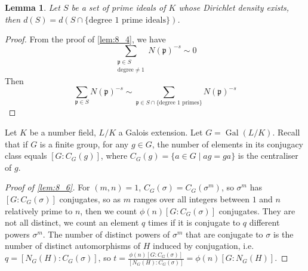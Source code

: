 \documentclass[11pt]{article}
\theoremstyle{definition}
\theoremstyle{plain}
\newtheorem{lemma}[definition]{Lemma}
\theoremstyle{remark}
\DeclareMathOperator{\Gal}{Gal}
\newcommand{\fp}{\mathfrak{p}}
\begin{document}
\begin{lemma}\label{lem:8_9}
    Let $S$ be a set of prime ideals of $K$ whose Dirichlet density exists, then $d(S) = d(S \cap \{\text{degree } 1 \text{ prime ideals}\})$.
\end{lemma}
\begin{proof}
    From the proof of \autoref{lem:8_4}, we have
    \begin{equation*}
        \sum_{\substack{\fp \in S \\ \text{degree} \neq 1}} N(\fp)^{-s} \sim 0
    \end{equation*}
    Then
    \begin{equation*}
        \sum_{\fp \in S} N(\fp)^{-s} \sim \sum_{\fp \in S \cap \{\text{degree } 1 \text{ primes}\}} N(\fp)^{-s}
    \end{equation*}
\end{proof}

Let $K$ be a number field, $L/K$ a Galois extension. Let $G = \Gal(L/K)$. Recall that if $G$ is a finite group, for any $g \in G$, the number of elements in its conjugacy class equals $[G : C_G(g)]$, where $C_G(g) = \{a \in G \mid ag=ga\}$ is the centraliser of $g$.

\begin{proof}[Proof of \autoref{lem:8_6}]
    For $(m, n)=1$, $C_G(\sigma) = C_G(\sigma^m)$, so $\sigma^m$ has $[G : C_G(\sigma)]$ conjugates, so as $m$ ranges over all integers between $1$ and $n$ relatively prime to $n$, then we count $\phi(n)[G : C_G(\sigma)]$ conjugates. They are not all distinct, we count an element $q$ times if it is conjugate to $q$ different powers $\sigma^m$. The number of distinct powers of $\sigma^m$ that are conjugate to $\sigma$ is the number of distinct automorphisms of $H$ induced by conjugation, i.e. $q = [N_G(H) : C_G(\sigma)]$, so $t = \frac{\phi(n) [G : C_G(\sigma)]}{[N_G(H) : C_G(\sigma)]} = \phi(n)[G : N_G(H)]$.
\end{proof}
\end{document}
